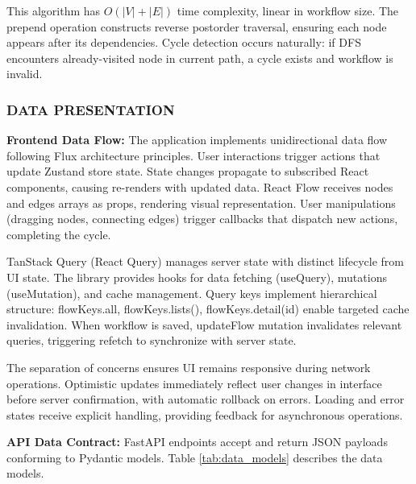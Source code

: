 \documentclass[12pt]{article}
\begin{document}
This algorithm has $O(|V| + |E|)$ time complexity, linear in workflow size. The prepend operation constructs reverse postorder traversal, ensuring each node appears after its dependencies. Cycle detection occurs naturally: if DFS encounters already-visited node in current path, a cycle exists and workflow is invalid.

\subsubsection{DATA PRESENTATION}

\hspace{\parindent}\textbf{Frontend Data Flow:} The application implements unidirectional data flow following Flux architecture principles. User interactions trigger actions that update Zustand store state. State changes propagate to subscribed React components, causing re-renders with updated data. React Flow receives nodes and edges arrays as props, rendering visual representation. User manipulations (dragging nodes, connecting edges) trigger callbacks that dispatch new actions, completing the cycle.

TanStack Query (React Query) manages server state with distinct lifecycle from UI state. The library provides hooks for data fetching (useQuery), mutations (useMutation), and cache management. Query keys implement hierarchical structure: flowKeys.all, flowKeys.lists(), flowKeys.detail(id) enable targeted cache invalidation. When workflow is saved, updateFlow mutation invalidates relevant queries, triggering refetch to synchronize with server state.

The separation of concerns ensures UI remains responsive during network operations. Optimistic updates immediately reflect user changes in interface before server confirmation, with automatic rollback on errors. Loading and error states receive explicit handling, providing feedback for asynchronous operations.

\hspace{\parindent}\textbf{API Data Contract:} FastAPI endpoints accept and return JSON payloads conforming to Pydantic models. Table \ref{tab:data_models} describes the data models.
\end{document}
